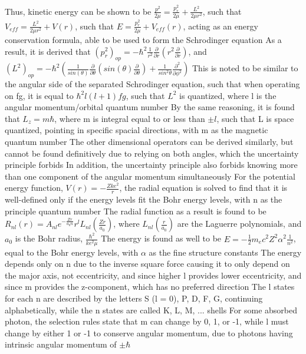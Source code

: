 \documentclass[11 pt, twoside]{article}
\newenvironment{outline*}
{
	\begin{outline}[enumerate]
	}
	{\end{outline}
}
\begin{document}
\begin{outline*}
		\3 Thus, kinetic energy can be shown to be $\frac{p^2}{2\mu} = \frac{p_r^2}{2\mu} + \frac{L^2}{2\mu r^2}$, such that $V_{eff} = \frac{L^2}{2\mu r^2} + V(r)$, such that $E = \frac{p_r^2}{2\mu} + V_{eff}(r)$, acting as an energy conservation formula, able to be used to form the Schrodinger equation
		\3 As a result, it is derived that $(p_r^2)_{op} = -\hbar^2 \frac{1}{r^2}\frac{\partial}{\partial r}(r^2 \frac{\partial}{\partial r})$, and $(L^2)_{op} = -\hbar^2(\frac{1}{sin(\theta)}\frac{\partial}{\partial \theta}(sin(\theta)\frac{\partial}{\partial \theta}) + \frac{1}{sin^2\theta}\frac{\partial^2}{\partial \phi^2})$
			\4 This is noted to be similar to the angular side of the separated Schrodinger equation, such that when operating on fg, it is equal to $\hbar^2l(l + 1)fg$, such that $L^2$ is quantized, where l is the angular momentum/orbital quantum number
			\4 By the same reasoning, it is found that $L_z = m\hbar$, where m is integral equal to or less than $\pm l$, such that L is space quantized, pointing in specific spacial directions, with m as the magnetic quantum number
		\3 The other dimensional operators can be derived similarly, but cannot be found definitively due to relying on both angles, which the uncertainty principle forbids
			\4 In addition, the uncertainty principle also forbids knowing more than one component of the angular momentum simultaneously
	\2 For the potential energy function, $V(r) = -\frac{Zke^2}{r}$, the radial equation is solved to find that it is well-defined only if the energy levels fit the Bohr energy levels, with n as the principle quantum number
		\3 The radial function as a result is found to be $R_{nl}(r) = A_{nl}e^{-\frac{Zr}{a_0n}}r^lL_{nl}(\frac{Zr}{a_0})$, where $L_{nl}(\frac{r}{a_0})$ are the Laguerre polynomials, and $a_0$ is the Bohr radius, $\frac{\hbar^2}{ke^2\mu}$
		\3 The energy is found as well to be $E = -\frac{1}{2}m_ec^2Z^2\alpha^2\frac{1}{n^2}$, equal to the Bohr energy levels, with $\alpha$ as the fine structure constants
	\2 The energy depends only on n due to the inverse square force causing it to only depend on the major axis, not eccentricity, and since higher l provides lower eccentricity, and since m provides the z-component, which has no preferred direction
		\3 The l states for each n are described by the letters S (l = 0), P, D, F, G, continuing alphabetically, while the n states are called K, L, M, ... shells
		\3 For some absorbed photon, the selection rules state that m can change by 0, 1, or -1, while l must change by either 1 or -1 to conserve angular momentum, due to photons having intrinsic angular momentum of $\pm \hbar$

\end{outline*}
\end{document}
